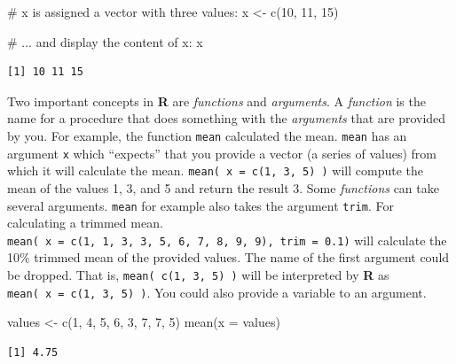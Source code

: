 \documentclass[
  letterpaper,
  DIV=11,
  numbers=noendperiod]{scrreprt}
\newenvironment{Shaded}{\begin{snugshade}}{\end{snugshade}}
\newcommand{\AttributeTok}[1]{\textcolor[rgb]{0.40,0.45,0.13}{#1}}
\newcommand{\CommentTok}[1]{\textcolor[rgb]{0.37,0.37,0.37}{#1}}
\newcommand{\DecValTok}[1]{\textcolor[rgb]{0.68,0.00,0.00}{#1}}
\newcommand{\FunctionTok}[1]{\textcolor[rgb]{0.28,0.35,0.67}{#1}}
\newcommand{\NormalTok}[1]{\textcolor[rgb]{0.00,0.23,0.31}{#1}}
\newcommand{\OtherTok}[1]{\textcolor[rgb]{0.00,0.23,0.31}{#1}}
\begin{document}
\begin{Shaded}
\begin{Highlighting}[]
\CommentTok{\# x is assigned a vector with three values:}
\NormalTok{x }\OtherTok{\textless{}{-}} \FunctionTok{c}\NormalTok{(}\DecValTok{10}\NormalTok{, }\DecValTok{11}\NormalTok{, }\DecValTok{15}\NormalTok{)}

\CommentTok{\# ... and display the content of x:}
\NormalTok{x}
\end{Highlighting}
\end{Shaded}

\begin{verbatim}
[1] 10 11 15
\end{verbatim}

Two important concepts in \textbf{R} are \emph{functions} and
\emph{arguments}. A \emph{function} is the name for a procedure that
does something with the \emph{arguments} that are provided by you. For
example, the function \texttt{mean} calculated the mean. \texttt{mean}
has an argument \texttt{x} which ``expects'' that you provide a vector
(a series of values) from which it will calculate the mean.
\texttt{mean(\ x\ =\ c(1,\ 3,\ 5)\ )} will compute the mean of the
values 1, 3, and 5 and return the result 3. Some \emph{functions} can
take several arguments. \texttt{mean} for example also takes the
argument \texttt{trim}. For calculating a trimmed mean.
\texttt{mean(\ x\ =\ c(1,\ 1,\ 3,\ 3,\ 5,\ 6,\ 7,\ 8,\ 9,\ 9),\ trim\ =\ 0.1)}
will calculate the 10\% trimmed mean of the provided values. The name of
the first argument could be dropped. That is,
\texttt{mean(\ c(1,\ 3,\ 5)\ )} will be interpreted by \textbf{R} as
\texttt{mean(\ x\ =\ c(1,\ 3,\ 5)\ )}. You could also provide a variable
to an argument.

\begin{Shaded}
\begin{Highlighting}[]
\NormalTok{values }\OtherTok{\textless{}{-}} \FunctionTok{c}\NormalTok{(}\DecValTok{1}\NormalTok{, }\DecValTok{4}\NormalTok{, }\DecValTok{5}\NormalTok{, }\DecValTok{6}\NormalTok{, }\DecValTok{3}\NormalTok{, }\DecValTok{7}\NormalTok{, }\DecValTok{7}\NormalTok{, }\DecValTok{5}\NormalTok{)}
\FunctionTok{mean}\NormalTok{(}\AttributeTok{x =}\NormalTok{ values)}
\end{Highlighting}
\end{Shaded}

\begin{verbatim}
[1] 4.75
\end{verbatim}
\end{document}
